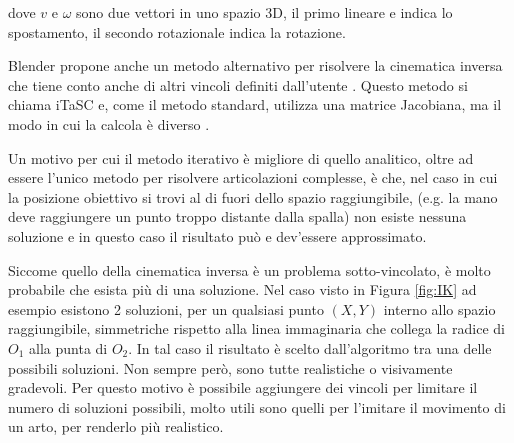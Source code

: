 dove $v$ e $\omega$ sono due vettori in uno spazio 3D, il primo lineare e indica lo spostamento, il secondo rotazionale indica la rotazione.

Blender propone anche un metodo alternativo per risolvere la cinematica inversa che tiene conto anche di altri vincoli definiti dall'utente \cite{blendDoc}. Questo metodo si chiama iTaSC e, come il metodo standard, utilizza una matrice Jacobiana, ma il modo in cui la calcola è diverso \cite{blendWiki}.

Un motivo per cui il metodo iterativo è migliore di quello analitico, oltre ad essere l'unico metodo per risolvere articolazioni complesse, è che, nel caso in cui la posizione obiettivo si trovi al di fuori dello spazio raggiungibile, (e.g. la mano deve raggiungere un punto troppo distante dalla spalla) non esiste nessuna soluzione e in questo caso il risultato può e dev'essere approssimato.

Siccome quello della cinematica inversa è un problema sotto-vincolato, è molto probabile che esista più di una soluzione. Nel caso visto in Figura \ref{fig:IK} ad esempio esistono 2 soluzioni, per un qualsiasi punto $(X,Y)$ interno allo spazio raggiungibile, simmetriche rispetto alla linea immaginaria che collega la radice di $O_1$ alla punta di $O_2$.
In tal caso il risultato è scelto dall'algoritmo tra una delle possibili soluzioni. Non sempre però, sono tutte realistiche o visivamente gradevoli.
Per questo motivo è possibile aggiungere dei vincoli per limitare il numero di soluzioni possibili, molto utili sono quelli per l'imitare il movimento di un arto, per renderlo più realistico.


